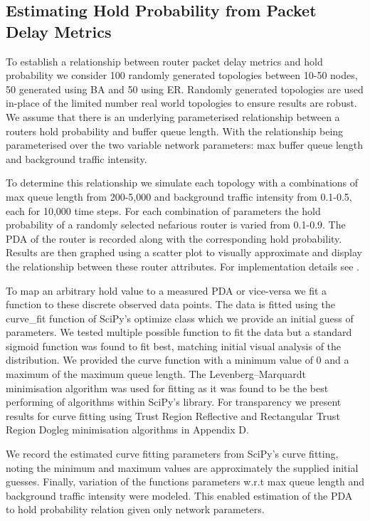   \subsection{Estimating Hold Probability from Packet Delay Metrics}
  \label{ssec:pdatoholdprob}
  To establish a relationship between router packet delay metrics and hold probability we  consider 100 randomly generated topologies between 10-50 nodes, 50 generated using BA and 50 using ER. Randomly generated topologies are used in-place of the limited number real world topologies to ensure results are robust. We assume that there is an underlying parameterised relationship between a routers hold probability and buffer queue length. With the relationship being parameterised over the two variable network parameters: max buffer queue length and background traffic intensity.\par
  To determine this relationship we simulate each topology with a combinations of max queue length from  200-5,000 and background traffic intensity from 0.1-0.5, each for 10,000 time steps. For each combination of parameters the hold probability of a randomly selected nefarious router is varied from 0.1-0.9. The PDA of the router is recorded along with the corresponding hold probability. Results are then graphed using a scatter plot to visually approximate and display the relationship between these router attributes. For implementation details see \cite{sylvester_millar_real_2021}.\par
  To map an arbitrary hold value to a measured PDA or vice-versa we fit a function to these discrete observed data points. The data is fitted using the curve\_fit function of SciPy's optimize class which we provide an initial guess of parameters. We tested multiple possible function to fit the data but a standard sigmoid function was found to fit best, matching initial visual analysis of the distribution. We provided the curve function with a minimum value of 0 and a maximum of the maximum queue length. The Levenberg–Marquardt minimisation algorithm was used for fitting as it was found to be the best performing of algorithms within SciPy's library. For transparency we present results for curve fitting using Trust Region Reflective and Rectangular Trust Region Dogleg minimisation algorithms in Appendix D.\par
  We record the estimated curve fitting parameters from SciPy's curve fitting, noting the minimum and maximum values are approximately the supplied initial guesses. Finally, variation of the functions parameters w.r.t max queue length and background traffic intensity were modeled. This enabled estimation of the PDA to hold probability relation given only network parameters.\par
